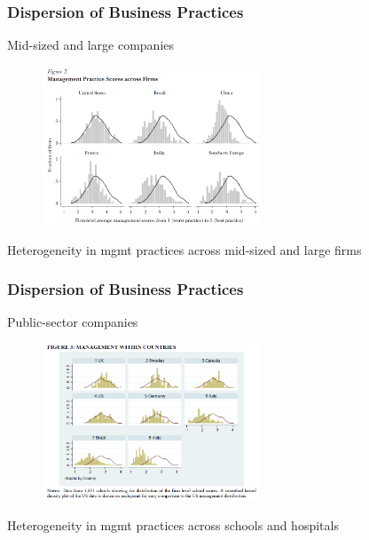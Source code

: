 \documentclass[hideothersubsections, usenames,dvipsnames,11pt]{beamer}
\newenvironment{itemize_2pt}{\itemize\addtolength{\itemsep}{2pt}}{\enditemize}
\begin{document}
\begin{frame}
\frametitle{Dispersion of Business Practices}

Mid-sized and large companies

\begin{figure}[htbp]
	\centering
	\includegraphics[width=17.4em]{pics/Bloom2010_mgmtdispersion.png}
	\label{Bloom(2010): Mgmt practices}
\end{figure}

\vspace{-1.0em}	

\begin{itemize_2pt}
	\item Heterogeneity in mgmt practices across mid-sized and large firms \citep{Bloom2007, Bloom2010, Syverson2011}
\end{itemize_2pt}
\end{frame}


\begin{frame}
\frametitle{Dispersion of Business Practices}

Public-sector companies

\begin{figure}[htbp]
	\centering
	\includegraphics[width=17.4em]{pics/Bloom2015_mgmtdispersion.png}
	\label{Bloom(2015): Mgmt practices}
\end{figure}

\vspace{-1.0em}

\begin{itemize_2pt}
	\item Heterogeneity in mgmt practices across schools \citep{Bloom2015} and hospitals \citep{Bloom2020}
\end{itemize_2pt}
\end{frame}
\end{document}
